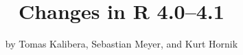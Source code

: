 \title{Changes in R 4.0--4.1}
\author{by Tomas Kalibera, Sebastian Meyer, and Kurt Hornik}

\maketitle





\address{%
Tomas Kalibera\\
\\%
\\
%
%
%
%
}

\address{%
Sebastian Meyer\\
\\%
\\
%
%
%
%
}

\address{%
Kurt Hornik\\
\\%
\\
%
%
%
%
}
